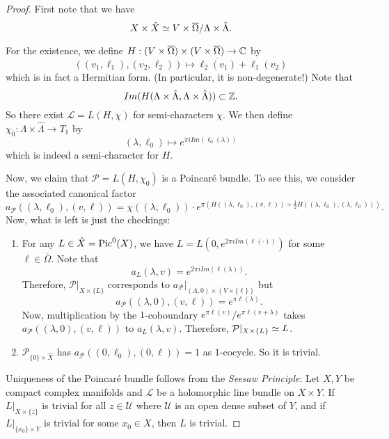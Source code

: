 \begin{proof}
First note that we have 
$$X\times \hat{X}\simeq V\times \overline{\Omega}/\Lambda\times \hat{\Lambda}.$$

For the existence, we define $H:(V\times \overline{\Omega})\times (V\times \overline{\Omega})\to {\mathbb C}$ by 
$$((v_1,\ell_1),(v_2,\ell_2))\mapsto \overline{\ell_2(v_1)}+\ell_1(v_2)$$
which is in fact a Hermitian form. (In particular, it is non-degenerate!) Note that
$$Im(H(\Lambda\times \hat{\Lambda},\Lambda\times \hat{\Lambda}))\subset {\mathbb Z}.$$
So there exist $\mathcal{L}=L(H,\chi)$ for semi-characters $\chi$. We then define $\chi_0: \Lambda\times \hat{\Lambda}\to T_1$ by 
$$(\lambda,\ell_0)\mapsto e^{\pi i Im(\ell_0(\lambda))}$$
which is indeed a semi-character for $H$. 

Now, we claim that $\mathcal{P}=L(H,\chi_0)$ is a Poincar\'{e} bundle. To see this, we consider the associated canonical factor 
$$a_\mathcal{P}((\lambda,\ell_0),(v,\ell))=\chi((\lambda,\ell_0))\cdot e^{\pi(H((\lambda,\ell_0),(v,\ell))+\frac{1}{2}H((\lambda,\ell_0),(\lambda,\ell_0)))}.$$
Now, what is left is just the checkings:
\begin{enumerate}
\item For any $L\in \hat{X}=\operatorname{Pic}^0(X)$, we have $L=L(0,e^{2\pi i Im(\ell(\cdot))})$ for some $\ell\in \overline{\Omega}$. Note that 
$$a_L(\lambda,v)=e^{2\pi i Im(\ell(\lambda))}.$$
 Therefore, 
$\mathcal{P}|_{X\times \{L\}}$ corresponds to $a_\mathcal{P}|_{(\Lambda,0)\times(V\times \{\ell\})}$ but $$a_\mathcal{P}((\lambda,0),(v,\ell))=e^{\pi \ell(\lambda)}.$$
Now, multiplication by the $1$-coboundary $e^{\pi \overline{\ell(v)}}/e^{\pi \overline{\ell(v+\lambda)}}$ takes $a_\mathcal{P}((\lambda,0),(v,\ell))$ to $a_L(\lambda,v)$. Therefore, $\mathcal{P}|_{X\times \{L\}}\simeq L$.
\item $\mathcal{P}_{\{0\}\times \hat{X}}$ has $a_\mathcal{P}((0,\ell_0),(0,\ell))=1$ as $1$-cocycle. So it is trivial.
\end{enumerate}

Uniqueness of the Poincar\'{e} bundle follows from the \emph{Seesaw Principle}: Let $X,Y$ be compact complex manifolds and $\mathcal{L}$ be a holomorphic line bundle on $X\times Y$. If $L|_{X\times \{z\}}$ is trivial for all $z\in \mathcal{U}$ where $\mathcal{U}$ is an open dense subset of $Y$, and if $L|_{\{x_0\}\times Y}$ is trivial for some $x_0\in X$, then $L$ is trivial. 




\end{proof}

